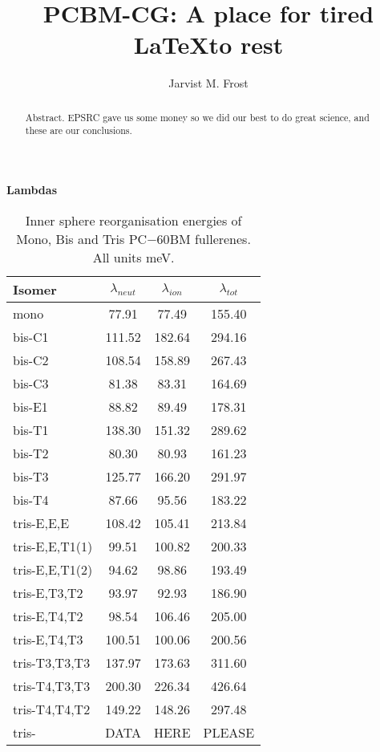 \documentclass[journal=jacsat,manuscript=communication]{achemso}
\title{PCBM-CG: A place for tired \LaTeX to rest}
\author{Jarvist M. Frost}
\affiliation{Centre for Sustainable Chemical Technologies and Department of Chemistry, University of Bath, Claverton Down, Bath BA2 7AY, UK}
\begin{document}
\begin{abstract}
Abstract. EPSRC gave us some money so we did our best to do great science, and these are our conclusions. 
\end{abstract}



\textbf{Lambdas}

\begin{table}
\centering
\begin{tabular}{lSSS}
\toprule
Isomer & $\lambda_{neut}$ & $\lambda_{ion}$ & $\lambda_{tot}$ \\
\midrule
mono & 77.91 & 77.49 & 155.40 \\
\midrule
bis-C1 & 111.52 & 182.64 & 294.16 \\
bis-C2 & 108.54 & 158.89 & 267.43 \\
bis-C3 & 81.38 & 83.31 & 164.69 \\
bis-E1 & 88.82 & 89.49 & 178.31 \\
bis-T1 & 138.30 & 151.32 & 289.62 \\
bis-T2 & 80.30 & 80.93 & 161.23 \\
bis-T3 & 125.77 & 166.20 & 291.97 \\
bis-T4 & 87.66 & 95.56 & 183.22 \\
\midrule
tris-E,E,E & 108.42 & 105.41 & 213.84 \\
tris-E,E,T1(1) & 99.51 & 100.82 & 200.33 \\
tris-E,E,T1(2) & 94.62 & 98.86 & 193.49 \\
tris-E,T3,T2 & 93.97 & 92.93 & 186.90 \\
tris-E,T4,T2 & 98.54 & 106.46 & 205.00 \\
tris-E,T4,T3 & 100.51 & 100.06 & 200.56 \\
tris-T3,T3,T3 & 137.97 & 173.63 & 311.60 \\
tris-T4,T3,T3 & 200.30 & 226.34 & 426.64 \\
tris-T4,T4,T2 & 149.22 & 148.26 & 297.48 \\
tris- & {DATA} & {HERE} & {PLEASE} \\
\bottomrule
\end{tabular}
\caption{\label{tab:Lambda}
Inner sphere reorganisation energies of Mono, Bis and Tris PC$-{60}$BM fullerenes. All units meV.}
\end{table}
\end{document}
